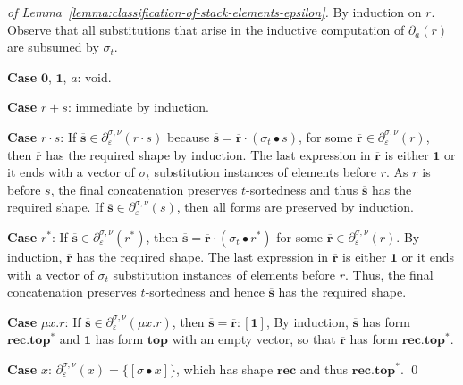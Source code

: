 \documentclass[runningheads, envcountsame, a4paper]{llncs}
\newcommand\pderiv[3][{}]{\partial^{#1}_{#3}(#2)}
\newcommand\Rnull{\mathbf0}
\newcommand\Rempty{\mathbf1}
\newcommand\PUSH{:}
\newcommand\SINGLETON[1]{{[#1]}}
\newcommand\RS{\ensuremath{\overline{\mathbf{r}}}}
\renewcommand\SS{\ensuremath{\overline{\mathbf{s}}}}
\newcommand\ApplySubst[2]{#1 \bullet #2} %
\begin{document}
\begin{proof}[of Lemma~\ref{lemma:classification-of-stack-elements-epsilon}]
  By induction on $r$. Observe that all substitutions that arise in
  the inductive computation of $\pderiv{r}a$ are subsumed by $\sigma_t$.

  \textbf{Case }$\Rnull$, $\Rempty$, $a$: void.

  \textbf{Case }$r+s$: immediate by induction.

  \textbf{Case }$r\cdot s$: If $\SS \in \pderiv[\sigma,\nu]{r\cdot
    s}\varepsilon$ because $\SS = \RS \cdot (\ApplySubst{\sigma_t} s)$, for some
  $\RS\in \pderiv[\sigma,\nu]r\varepsilon$, then $\RS$ has the required shape by
  induction.
  The last expression in $\RS$  is either $\Rempty$ 
  or it ends with a vector of $\sigma_t$ substitution instances of
  elements before $r$. As $r$ is before $s$, the final concatenation
  preserves $t$-sortedness and thus $\SS$ has the required shape.
  If $\SS \in
  \pderiv[\sigma,\nu]s\varepsilon$, then all forms are 
  preserved by induction.

  \textbf{Case }$r^*$:  If $\SS \in \pderiv[\sigma,\nu]{r^*}\varepsilon$, then
  $\SS = \RS \cdot (\ApplySubst{\sigma_t} r^*)$ for some $\RS\in
  \pderiv[\sigma,\nu]r\varepsilon$. By induction, $\RS$ has the required
  shape. The last expression in $\RS$ is either $\Rempty$ 
  or it ends with a vector of $\sigma_t$ substitution instances of
  elements before $r$. Thus, the final concatenation preserves
  $t$-sortedness and hence $\SS$ has the required shape.

  \textbf{Case }$\mu x.r$: 
  If $\SS \in \pderiv[\sigma,\nu]{\mu x.r}\varepsilon$,
  then $\SS = \RS \PUSH \SINGLETON\Rempty$, By induction, $\SS$ has
  form $\mathbf{rec}.\mathbf{top}^*$ and $\Rempty$ has form $\mathbf{top}$ with an
  empty vector, so that $\RS$ has form $\mathbf{rec}.\mathbf{top}^*$. 

  \textbf{Case }$x$: $\pderiv[\sigma,\nu]{x}\varepsilon = \{
  \SINGLETON{\ApplySubst\sigma x} \}$, which has shape $\mathbf{rec}$
  and thus $\mathbf{rec}.\mathbf{top}^*$.
  \qed
\end{proof}
\end{document}
